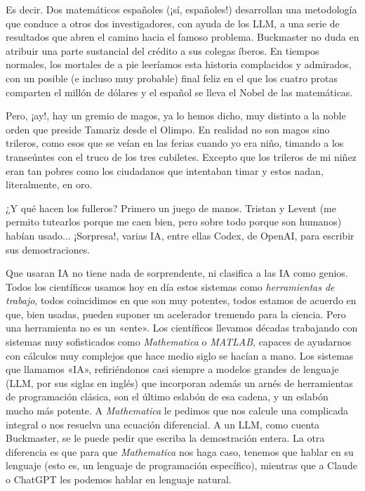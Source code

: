 \documentclass[11pt,a4paper]{article}
\begin{document}
Es decir. Dos matemáticos españoles (¡sí, españoles!) desarrollan una metodología que conduce a otros dos investigadores, con ayuda de los LLM, a una serie de resultados que abren el camino hacia el famoso problema. Buckmaster no duda en atribuir una parte sustancial del crédito a sus colegas íberos. En tiempos normales, los mortales de a pie leeríamos esta historia complacidos y admirados, con un posible (e incluso muy probable) final feliz en el que los cuatro protas comparten el millón de dólares y el español se lleva el Nobel de las matemáticas.

Pero, ¡ay!, hay un gremio de magos, ya lo hemos dicho, muy distinto a la noble orden que preside Tamariz desde el Olimpo. En realidad no son magos sino trileros, como esos que se veían en las ferias cuando yo era niño, timando a los transeúntes con el truco de los tres cubiletes. Excepto que los trileros de mi niñez eran tan pobres como los ciudadanos que intentaban timar y estos nadan, literalmente, en oro.

¿Y qué hacen los fulleros? Primero un juego de manos. Tristan y Levent (me permito tutearlos porque me caen bien, pero sobre todo porque son humanos) habían usado... ¡Sorpresa!, varias IA, entre ellas Codex, de OpenAI, para escribir sus demostraciones.

Que usaran IA no tiene nada de sorprendente, ni clasifica a las IA como genios. Todos los científicos usamos hoy en día estos sistemas como \emph{herramientas de trabajo}, todos coincidimos en que son muy potentes, todos estamos de acuerdo en que, bien usadas, pueden suponer un acelerador tremendo para la ciencia. Pero una herramienta no es un «ente». Los científicos llevamos décadas trabajando con sistemas muy sofisticados como \emph{Mathematica} o \emph{MATLAB}, capaces de ayudarnos con cálculos muy complejos que hace medio siglo se hacían a mano. Los sistemas que llamamos «IA», refiriéndonos casi siempre a modelos grandes de lenguaje (LLM, por sus siglas en inglés) que incorporan además un arnés de herramientas de programación clásica, son el último eslabón de esa cadena, y un eslabón mucho más potente. A \emph{Mathematica} le pedimos que nos calcule una complicada integral o nos resuelva una ecuación diferencial. A un LLM, como cuenta Buckmaster, se le puede pedir que escriba la demostración entera. La otra diferencia es que para que \emph{Mathematica} nos haga caso, tenemos que hablar en su lenguaje (esto es, un lenguaje de programación específico), mientras que a Claude o ChatGPT les podemos hablar en lenguaje natural.
\end{document}
